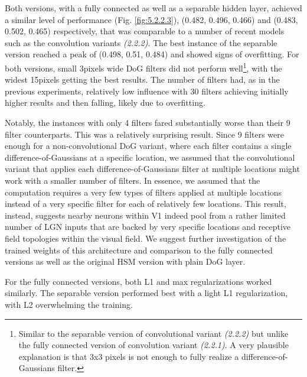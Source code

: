 Both versions, with a fully connected as well as a separable hidden layer, achieved a similar level of performance (Fig. \ref{fig:5.2.2.3}), (0.482, 0.496, 0.466) and (0.483, 0.502, 0.465) respectively, that was comparable to a number of recent models such as the convolution variants \textit{(2.2.2)}. The best instance of the separable version reached a peak of (0.498, 0.51, 0.484) and showed signs of overfitting. For both versions, small 3pixels wide DoG filters did not perform well\footnote{Similar to the separable version of convolutional variant \textit{(2.2.2)} but unlike the fully connected version of convolution variant \textit{(2.2.1)}. A very plausible explanation is that 3x3 pixels is not enough to fully realize a difference-of-Gaussians filter.}, with the widest 15pixels getting the best results. The number of filters had, as in the previous experiments, relatively low influence with 30 filters achieving initially higher results and then falling, likely due to overfitting.

Notably, the instances with only 4 filters fared substantially worse than their 9 filter counterparts. This was a relatively surprising result. Since 9 filters were enough for a non-convolutional DoG variant, where each filter contains a single difference-of-Gaussians at a specific location, we assumed that the convolutional variant that applies each difference-of-Gaussians filter at multiple locations might work with a smaller number of filters. In essence, we assumed that the computation requires a very few types of filters applied at multiple locations instead of a very specific filter for each of relatively few locations. This result, instead, suggests nearby neurons within V1 indeed pool from a rather limited number of LGN inputs that are backed by very specific locations and receptive field topologies within the visual field. We suggest further investigation of the trained weights of this architecture and comparison to the fully connected versions as well as the original HSM version with plain DoG layer.

For the fully connected versions, both L1 and max regularizations worked similarly. The separable version performed best with a light L1 regularization, with L2 overwhelming the training.

